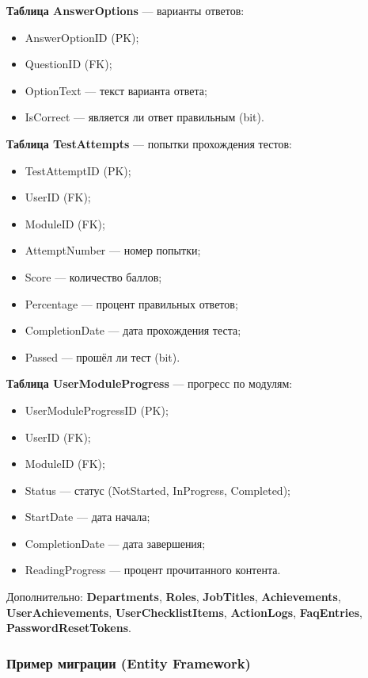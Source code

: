\textbf{Таблица AnswerOptions} --- варианты ответов:
\begin{itemize}
    \item AnswerOptionID (PK);
    \item QuestionID (FK);
    \item OptionText --- текст варианта ответа;
    \item IsCorrect --- является ли ответ правильным (bit).
\end{itemize}

\textbf{Таблица TestAttempts} --- попытки прохождения тестов:
\begin{itemize}
    \item TestAttemptID (PK);
    \item UserID (FK);
    \item ModuleID (FK);
    \item AttemptNumber --- номер попытки;
    \item Score --- количество баллов;
    \item Percentage --- процент правильных ответов;
    \item CompletionDate --- дата прохождения теста;
    \item Passed --- прошёл ли тест (bit).
\end{itemize}

\textbf{Таблица UserModuleProgress} --- прогресс по модулям:
\begin{itemize}
    \item UserModuleProgressID (PK);
    \item UserID (FK);
    \item ModuleID (FK);
    \item Status --- статус (NotStarted, InProgress, Completed);
    \item StartDate --- дата начала;
    \item CompletionDate --- дата завершения;
    \item ReadingProgress --- процент прочитанного контента.
\end{itemize}

Дополнительно: \textbf{Departments}, \textbf{Roles}, \textbf{JobTitles}, \textbf{Achievements}, \textbf{UserAchievements}, \textbf{UserChecklistItems}, \textbf{ActionLogs}, \textbf{FaqEntries}, \textbf{PasswordResetTokens}.

\subsubsection{Пример миграции (Entity Framework)}

